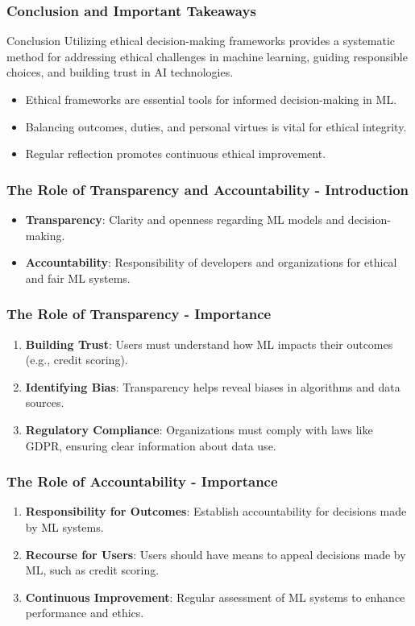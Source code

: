 \documentclass[aspectratio=169]{beamer}
\begin{document}
\begin{frame}[fragile]
    \frametitle{Conclusion and Important Takeaways}
    \begin{block}{Conclusion}
        Utilizing ethical decision-making frameworks provides a systematic method for addressing ethical challenges in machine learning, guiding responsible choices, and building trust in AI technologies.
    \end{block}
    \begin{itemize}
        \item Ethical frameworks are essential tools for informed decision-making in ML.
        \item Balancing outcomes, duties, and personal virtues is vital for ethical integrity.
        \item Regular reflection promotes continuous ethical improvement.
    \end{itemize}
\end{frame}

\begin{frame}[fragile]
    \frametitle{The Role of Transparency and Accountability - Introduction}
    \begin{itemize}
        \item \textbf{Transparency}: Clarity and openness regarding ML models and decision-making.
        \item \textbf{Accountability}: Responsibility of developers and organizations for ethical and fair ML systems.
    \end{itemize}
\end{frame}

\begin{frame}[fragile]
    \frametitle{The Role of Transparency - Importance}
    \begin{enumerate}
        \item \textbf{Building Trust}: Users must understand how ML impacts their outcomes (e.g., credit scoring).
        \item \textbf{Identifying Bias}: Transparency helps reveal biases in algorithms and data sources.
        \item \textbf{Regulatory Compliance}: Organizations must comply with laws like GDPR, ensuring clear information about data use.
    \end{enumerate}
\end{frame}

\begin{frame}[fragile]
    \frametitle{The Role of Accountability - Importance}
    \begin{enumerate}
        \item \textbf{Responsibility for Outcomes}: Establish accountability for decisions made by ML systems.
        \item \textbf{Recourse for Users}: Users should have means to appeal decisions made by ML, such as credit scoring.
        \item \textbf{Continuous Improvement}: Regular assessment of ML systems to enhance performance and ethics.
    \end{enumerate}
\end{frame}
\end{document}
